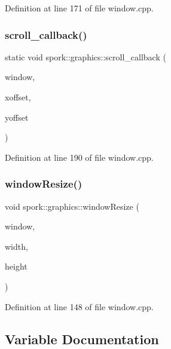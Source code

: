 Definition at line 171 of file window.\+cpp.

\mbox{\label{namespacespork_1_1graphics_a7c889944b857dd6bf9d2c4142f7d8854}} 
\subsubsection{\texorpdfstring{scroll\+\_\+callback()}{scroll\_callback()}}
{\footnotesize\ttfamily static void spork\+::graphics\+::scroll\+\_\+callback (\begin{DoxyParamCaption}\item[{G\+L\+F\+Wwindow $\ast$}]{window,  }\item[{double}]{xoffset,  }\item[{double}]{yoffset }\end{DoxyParamCaption})\hspace{0.3cm}{\ttfamily [static]}}



Definition at line 190 of file window.\+cpp.

\mbox{\label{namespacespork_1_1graphics_ae56f76d7d8bd7ad755a954ca993878ce}} 
\subsubsection{\texorpdfstring{window\+Resize()}{windowResize()}}
{\footnotesize\ttfamily void spork\+::graphics\+::window\+Resize (\begin{DoxyParamCaption}\item[{G\+L\+F\+Wwindow $\ast$}]{window,  }\item[{int}]{width,  }\item[{int}]{height }\end{DoxyParamCaption})}



Definition at line 148 of file window.\+cpp.



\subsection{Variable Documentation}
\mbox{\label{namespacespork_1_1graphics_ac9787589d8e71045e39ed02bc8a0c0b2}} 
